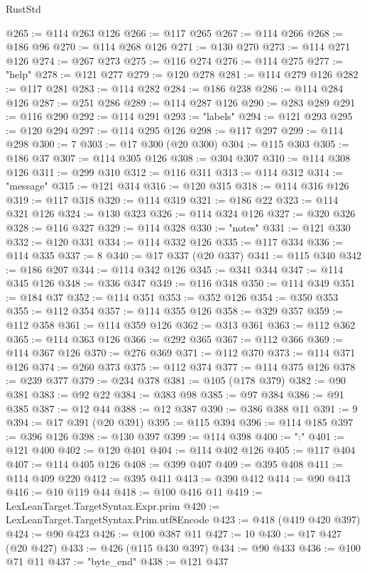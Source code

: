 \begin{lexlean}{RustStd}
\begin{coremodule}
@265 := @114 @263 @126
@266 := @117 @265
@267 := @114 @266
@268 := @186 @96
@270 := @114 @268 @126
@271 := @130 @270
@273 := @114 @271 @126
@274 := @267 @273
@275 := @116 @274
@276 := @114 @275
@277 := "help"
@278 := @121 @277
@279 := @120 @278
@281 := @114 @279 @126
@282 := @117 @281
@283 := @114 @282
@284 := @186 @238
@286 := @114 @284 @126
@287 := @251 @286
@289 := @114 @287 @126
@290 := @283 @289
@291 := @116 @290
@292 := @114 @291
@293 := "labels"
@294 := @121 @293
@295 := @120 @294
@297 := @114 @295 @126
@298 := @117 @297
@299 := @114 @298
@300 := 7
@303 := @17 @300 (@20 @300)
@304 := @115 @303
@305 := @186 @37
@307 := @114 @305 @126
@308 := @304 @307
@310 := @114 @308 @126
@311 := @299 @310
@312 := @116 @311
@313 := @114 @312
@314 := "message"
@315 := @121 @314
@316 := @120 @315
@318 := @114 @316 @126
@319 := @117 @318
@320 := @114 @319
@321 := @186 @22
@323 := @114 @321 @126
@324 := @130 @323
@326 := @114 @324 @126
@327 := @320 @326
@328 := @116 @327
@329 := @114 @328
@330 := "notes"
@331 := @121 @330
@332 := @120 @331
@334 := @114 @332 @126
@335 := @117 @334
@336 := @114 @335
@337 := 8
@340 := @17 @337 (@20 @337)
@341 := @115 @340
@342 := @186 @207
@344 := @114 @342 @126
@345 := @341 @344
@347 := @114 @345 @126
@348 := @336 @347
@349 := @116 @348
@350 := @114 @349
@351 := @184 @37
@352 := @114 @351
@353 := @352 @126
@354 := @350 @353
@355 := @112 @354
@357 := @114 @355 @126
@358 := @329 @357
@359 := @112 @358
@361 := @114 @359 @126
@362 := @313 @361
@363 := @112 @362
@365 := @114 @363 @126
@366 := @292 @365
@367 := @112 @366
@369 := @114 @367 @126
@370 := @276 @369
@371 := @112 @370
@373 := @114 @371 @126
@374 := @260 @373
@375 := @112 @374
@377 := @114 @375 @126
@378 := @239 @377
@379 := @234 @378
@381 := @105 (@178 @379)
@382 := @90 @381
@383 := @92 @22
@384 := @383 @98
@385 := @97 @384
@386 := @91 @385
@387 := @12 @44
@388 := @12 @387
@390 := @386 @388 @11
@391 := 9
@394 := @17 @391 (@20 @391)
@395 := @115 @394
@396 := @114 @185
@397 := @396 @126
@398 := @130 @397
@399 := @114 @398
@400 := ":"
@401 := @121 @400
@402 := @120 @401
@404 := @114 @402 @126
@405 := @117 @404
@407 := @114 @405 @126
@408 := @399 @407
@409 := @395 @408
@411 := @114 @409 @220
@412 := @395 @411
@413 := @390 @412
@414 := @90 @413
@416 := @10 @119 @44
@418 := @100 @416 @11
@419 := LexLeanTarget.TargetSyntax.Expr.prim
@420 := LexLeanTarget.TargetSyntax.Prim.utf8Encode
@423 := @418 (@419 @420 @397)
@424 := @90 @423
@426 := @100 @387 @11
@427 := 10
@430 := @17 @427 (@20 @427)
@433 := @426 (@115 @430 @397)
@434 := @90 @433
@436 := @100 @71 @11
@437 := "byte_end"
@438 := @121 @437

\end{coremodule}
\end{lexlean}
